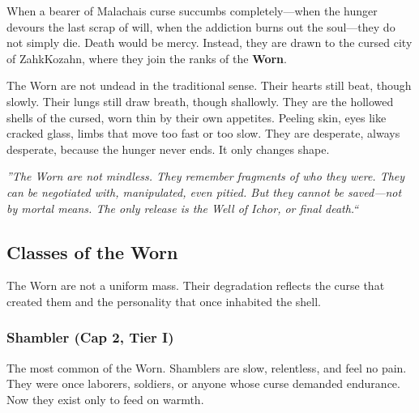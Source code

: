 \documentclass[11pt]{article}
\begin{document}
When a bearer of Malachai\textquotesingle s curse succumbs completely---when the hunger devours the last scrap of will, when the addiction burns out the soul---they do not simply die. Death would be mercy. Instead, they are drawn to the cursed city of Zahk\textquotesingle Kozahn, where they join the ranks of the \textbf{Worn}.

The Worn are not undead in the traditional sense. Their hearts still beat, though slowly. Their lungs still draw breath, though shallowly. They are the hollowed shells of the cursed, worn thin by their own appetites. Peeling skin, eyes like cracked glass, limbs that move too fast or too slow. They are desperate, always desperate, because the hunger never ends. It only changes shape.

\begin{mdframed}[backgroundcolor=horrorbg, linecolor=bloodcolor]
\centering
\textit{''The Worn are not mindless. They remember fragments of who they were. They can be negotiated with, manipulated, even pitied. But they cannot be saved---not by mortal means. The only release is the Well of Ichor, or final death.``}
\end{mdframed}

\subsection{Classes of the Worn}

The Worn are not a uniform mass. Their degradation reflects the curse that created them and the personality that once inhabited the shell.

\subsubsection{Shambler (Cap 2, Tier I)}

The most common of the Worn. Shamblers are slow, relentless, and feel no pain. They were once laborers, soldiers, or anyone whose curse demanded endurance. Now they exist only to feed on warmth.
\end{document}

